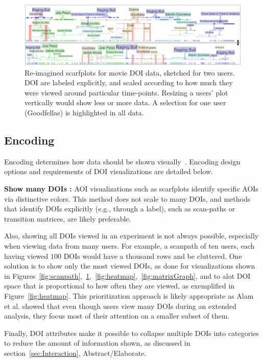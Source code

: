 \begin{figure}
  \centering
  \includegraphics[width=0.95\linewidth]{images/Scarfs.eps}
  \caption{Re-imagined scarfplots for movie DOI data, sketched for two users. DOI are labeled explicitly, and scaled according to how much they were viewed around particular time-points. Resizing a users' plot vertically would show less or more data. A selection for one user (Goodfellas) is highlighted in all data. }
	\label{fig:scarfs}
\end{figure}

\subsection{Encoding}
\label{sec:Encoding}
Encoding determines how data should be shown visually~\cite{yi2007toward}. Encoding design options and requirements of DOI visualizations are detailed below.

\noindent \textbf{Show many DOIs :} AOI visualizations such as scarfplots identify specific AOIs via distinctive colors. This method does not scale to many DOIs, and methods that identify DOIs explicitly (e.g., through a label), such as scan-paths or transition matrices, are likely preferable. 

Also, showing all DOIs viewed in an experiment is not always possible, especially when viewing data from many users. For example, a scanpath of ten users, each having viewed $100$ DOIs would have a thousand rows and be cluttered. One solution is to show only the most viewed DOIs, as done for visualizations shown in Figures~\ref{fig:scanpath},~\ref{fig:scarfs},~\ref{fig:heatmap},~\ref{fig:matrixGraph}, and to alot DOI space that is proportional to how often they are viewed, as exemplified in Figure~\ref{fig:heatmap}. This prioritization approach is likely appropriate as Alam et al. showed that even though users view many DOIs during an extended analysis, they focus most of their attention on a smaller subset of them. 

Finally, DOI attributes make it possible to collapse multiple DOIs into categories to reduce the amount of information shown, as discussed in section~\ref{sec:Interaction}, Abstract/Elaborate.

